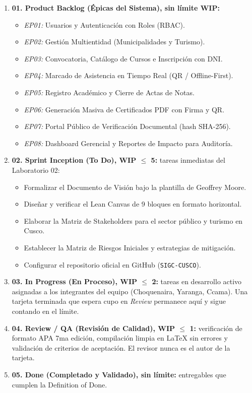 \begin{enumerate}\setlength\itemsep{0.2em}
    \item \textbf{01. Product Backlog (Épicas del Sistema), sin límite WIP:}
    \begin{itemize}\setlength\itemsep{0.1em}
        \item \textit{EP01:} Usuarios y Autenticación con Roles (RBAC).
        \item \textit{EP02:} Gestión Multientidad (Municipalidades y Turismo).
        \item \textit{EP03:} Convocatoria, Catálogo de Cursos e Inscripción con DNI.
        \item \textit{EP04:} Marcado de Asistencia en Tiempo Real (QR / Offline-First).
        \item \textit{EP05:} Registro Académico y Cierre de Actas de Notas.
        \item \textit{EP06:} Generación Masiva de Certificados PDF con Firma y QR.
        \item \textit{EP07:} Portal Público de Verificación Documental (hash SHA-256).
        \item \textit{EP08:} Dashboard Gerencial y Reportes de Impacto para Auditoría.
    \end{itemize}

    \item \textbf{02. Sprint Inception (To Do), WIP $\le$ 5:} tareas inmediatas del Laboratorio 02:
    \begin{itemize}\setlength\itemsep{0.1em}
        \item Formalizar el Documento de Visión bajo la plantilla de Geoffrey Moore.
        \item Diseñar y verificar el Lean Canvas de 9 bloques en formato horizontal.
        \item Elaborar la Matriz de Stakeholders para el sector público y turismo en Cusco.
        \item Establecer la Matriz de Riesgos Iniciales y estrategias de mitigación.
        \item Configurar el repositorio oficial en GitHub (\texttt{SIGC-CUSCO}).
    \end{itemize}

    \item \textbf{03. In Progress (En Proceso), WIP $\le$ 2:} tareas en desarrollo activo asignadas a los integrantes del equipo (Choquenaira, Yaranga, Ccama). Una tarjeta terminada que espera cupo en \textit{Review} permanece aquí y sigue contando en el límite.

    \item \textbf{04. Review / QA (Revisión de Calidad), WIP $\le$ 1:} verificación de formato APA 7ma edición, compilación limpia en \LaTeX{} sin errores y validación de criterios de aceptación. El revisor nunca es el autor de la tarjeta.

    \item \textbf{05. Done (Completado y Validado), sin límite:} entregables que cumplen la Definition of Done.
\end{enumerate}

